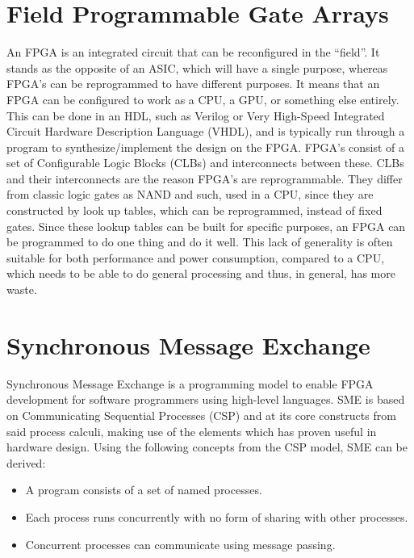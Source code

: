 \documentclass[a4paper, openany]{book}
\begin{document}
\section{Field Programmable Gate Arrays}
\label{sec:orgb72a249}
An FPGA is an integrated circuit that can be reconfigured in the ``field''. It stands as the opposite of an ASIC, which will have a single purpose, whereas FPGA's can be reprogrammed to have different purposes. It means that an FPGA can be configured to work as a CPU, a GPU, or something else entirely. This can be done in an HDL, such as Verilog or Very High-Speed Integrated Circuit Hardware Description Language (VHDL), and is typically run through a program to synthesize/implement the design on the FPGA.
FPGA's consist of a set of Configurable Logic Blocks (CLBs) and interconnects between these. CLBs and their interconnects are the reason FPGA's are reprogrammable. They differ from classic logic gates as NAND and such, used in a CPU, since they are constructed by look up tables, which can be reprogrammed, instead of fixed gates. Since these lookup tables can be built for specific purposes, an FPGA can be programmed to do one thing and do it well. This lack of generality is often suitable for both performance and power consumption, compared to a CPU, which needs to be able to do general processing and thus, in general, has more waste.

\section{Synchronous Message Exchange}
\label{sec:SME}
Synchronous Message Exchange is a programming model to enable FPGA development for software programmers using high-level languages. SME is based on Communicating Sequential Processes (CSP) and at its core constructs from said process calculi, making use of the elements which has proven useful in hardware design\cite{sme}. Using the following concepts from the CSP model\cite{CSP}, SME can be derived:

\begin{itemize}
\item A program consists of a set of named processes.
\item Each process runs concurrently with no form of sharing with other processes.
\item Concurrent processes can communicate using message passing.
\end{itemize}
\end{document}
